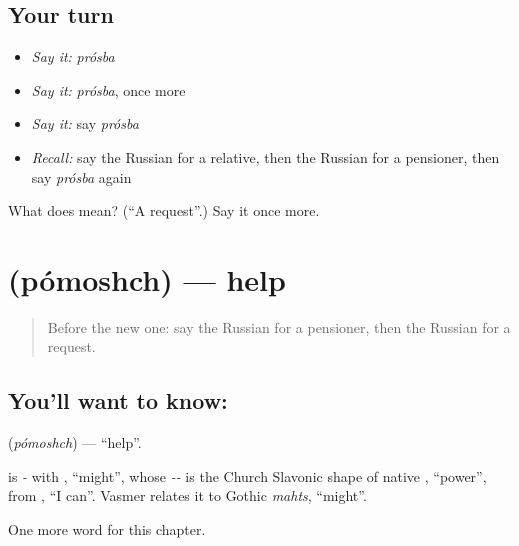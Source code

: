 \subsection*{Your turn}
\begin{itemize}
\raggedright
  \item \emph{Say it:} \emph{prósba}
  \item \emph{Say it:} \emph{prósba}, once more
  \item \emph{Say it:} say \emph{prósba}
  \item \emph{Recall:} say the Russian for a relative, then the Russian for a pensioner, then say \emph{prósba} again
\end{itemize}

\begin{tcolorbox}[breakable,colback=teal!4,colframe=teal!35!black,title={Before you move on}]
What does  mean? (\textquotedblleft{}A request\textquotedblright{}.) Say it once more.
\end{tcolorbox}
\section[\texorpdfstring{\ru{помощь} (pómoshch)}{помощь (pómoshch)}]{ (pómoshch) — help}

\label{lesson:RU-C169-pomoshch}



\begin{quote}
Before the new one: say the Russian for a pensioner, then the Russian for a request.
\end{quote}

\subsection*{You'll want to know: }
\textbf{} (\emph{pómoshch}) — \textquotedblleft{}help\textquotedblright{}.

\begin{cousinweb}
\textbf{} is \emph{-} with \emph{}, \textquotedblleft{}might\textquotedblright{}, whose \emph{--} is the Church Slavonic shape of native \emph{}, \textquotedblleft{}power\textquotedblright{}, from \emph{}, \textquotedblleft{}I can\textquotedblright{}. Vasmer relates it to Gothic \emph{mahts}, \textquotedblleft{}might\textquotedblright{}.
\end{cousinweb}

\begin{grammarlens}[title={What you've built}]
One more word for this chapter.
\end{grammarlens}

